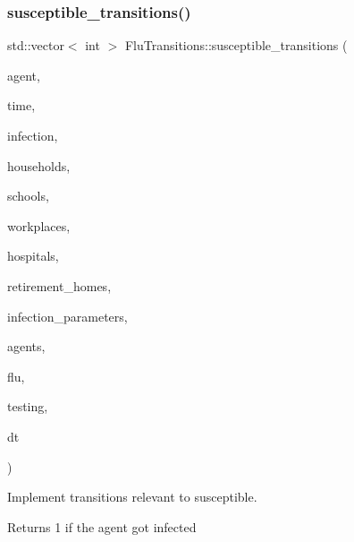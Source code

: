 \subsubsection{\texorpdfstring{susceptible\+\_\+transitions()}{susceptible\_transitions()}}
{\footnotesize\ttfamily std\+::vector$<$ int $>$ Flu\+Transitions\+::susceptible\+\_\+transitions (\begin{DoxyParamCaption}\item[{\hyperlink{classAgent}{Agent} \&}]{agent,  }\item[{const double}]{time,  }\item[{\hyperlink{classInfection}{Infection} \&}]{infection,  }\item[{std\+::vector$<$ \hyperlink{classHousehold}{Household} $>$ \&}]{households,  }\item[{std\+::vector$<$ \hyperlink{classSchool}{School} $>$ \&}]{schools,  }\item[{std\+::vector$<$ \hyperlink{classWorkplace}{Workplace} $>$ \&}]{workplaces,  }\item[{std\+::vector$<$ \hyperlink{classHospital}{Hospital} $>$ \&}]{hospitals,  }\item[{std\+::vector$<$ \hyperlink{classRetirementHome}{Retirement\+Home} $>$ \&}]{retirement\+\_\+homes,  }\item[{const std\+::map$<$ std\+::string, double $>$ \&}]{infection\+\_\+parameters,  }\item[{std\+::vector$<$ \hyperlink{classAgent}{Agent} $>$ \&}]{agents,  }\item[{\hyperlink{classFlu}{Flu} \&}]{flu,  }\item[{const \hyperlink{classTesting}{Testing} \&}]{testing,  }\item[{const double}]{dt }\end{DoxyParamCaption})}



Implement transitions relevant to susceptible. 

Returns 1 if the agent got infected \mbox{\label{classFluTransitions_ac6ab415922b627b54090216237c5c79e}} 
